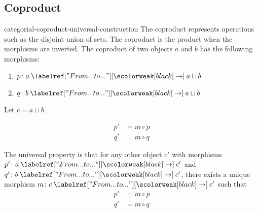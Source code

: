 \documentclass[preview]{standalone}
\begin{document}
\subsection{Coproduct}

\begin{snippet}{categorial-coproduct-universal-construction}
The coproduct represents operations
such as the disjoint union of sets.
The coproduct is the product when the morphisms are inverted.
The coproduct of two objects \(a\) and \(b\) has the following
morphisms:
\begin{enumerate}
    \item \(p \colon a \fromto a\sqcup b\)
    \item \(q \colon b \fromto a\sqcup b\)
\end{enumerate}

Let \(c=a\sqcup b\).

\begin{minipage}{0.5\textwidth}
\end{minipage}
\begin{minipage}{0.5\textwidth}
    \begin{align*}
        p' &= m \circ p \\
        q' &= m \circ q
    \end{align*}
\end{minipage}

The universal property is that for any other object \(c'\)
with morphisms \(p' \colon a \fromto c'\) and \(q' \colon b \fromto c'\),
there exists a unique morphism \(m \colon c \fromto c'\)
such that
\begin{align*}
    p' &= m \circ p \\
    q' &= m \circ q
\end{align*}
\end{snippet}
\end{document}

